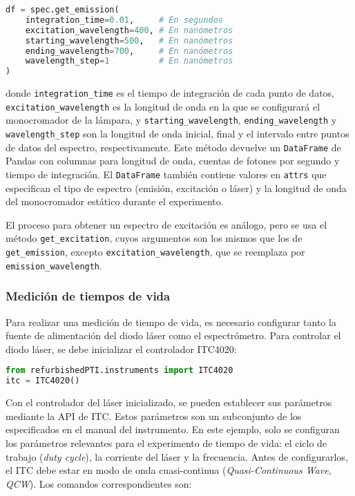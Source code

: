 \begin{lstlisting}[language=Python]
df = spec.get_emission(
    integration_time=0.01,     # En segundos
    excitation_wavelength=400, # En nanómetros
    starting_wavelength=500,   # En nanómetros
    ending_wavelength=700,     # En nanómetros
    wavelength_step=1          # En nanómetros
)
\end{lstlisting}

\noindent donde \texttt{integration\_time} es el tiempo de integración de cada punto de datos, \texttt{excitation\_wavelength} es la longitud de onda en la que se configurará el monocromador de la lámpara, y \texttt{starting\_wavelength}, \texttt{ending\_wavelength} y \texttt{wavelength\_step} son la longitud de onda inicial, final y el intervalo entre puntos de datos del espectro, respectivamente. Este método devuelve un \texttt{DataFrame} de Pandas con columnas para longitud de onda, cuentas de fotones por segundo y tiempo de integración. El \texttt{DataFrame} también contiene valores en \texttt{attrs} que especifican el tipo de espectro (emisión, excitación o láser) y la longitud de onda del monocromador estático durante el experimento. 

El proceso para obtener un espectro de excitación es análogo, pero se usa el método \texttt{get\_excitation}, cuyos argumentos son los mismos que los de \texttt{get\_emission}, excepto \texttt{excitation\_wavelength}, que se reemplaza por \texttt{emission\_wavelength}.

\subsubsection{Medición de tiempos de vida}

Para realizar una medición de tiempo de vida, es necesario configurar tanto la fuente de alimentación del diodo láser como el espectrómetro. Para controlar el diodo láser, se debe inicializar el controlador ITC4020:

\begin{lstlisting}[language=Python]
from refurbishedPTI.instruments import ITC4020
itc = ITC4020()
\end{lstlisting}

\noindent Con el controlador del láser inicializado, se pueden establecer sus parámetros mediante la API de ITC. Estos parámetros son un subconjunto de los especificados en el manual del instrumento. En este ejemplo, solo se configuran los parámetros relevantes para el experimento de tiempo de vida: el ciclo de trabajo (\textit{duty cycle}), la corriente del láser y la frecuencia. Antes de configurarlos, el ITC debe estar en modo de onda cuasi-continua (\textit{Quasi-Continuous Wave, QCW}). Los comandos correspondientes son:

